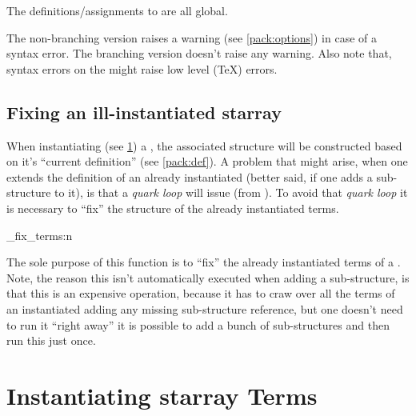 \documentclass[10pt]{article}
\begin{document}

The definitions/assignments  to  are all global.

\begin{tsremark}
The non-branching version raises a warning (see \ref{pack:options}) in case of a  syntax error. The branching version doesn't raise any warning. Also note that, syntax errors on the  might raise low level (\TeX) errors.
\end{tsremark}

\subsection{Fixing an ill-instantiated starray}\label{pack:def-fix}

When instantiating (see \ref{pack:instantiate}) a , the associated structure will be constructed based on it's ``current definition'' (see \ref{pack:def}). A problem that might arise, when one extends the definition of an already instantiated   (better said, if one adds a sub-structure to it), is that a \textsl{quark loop} will issue (from ). To avoid that  \textsl{quark loop} it is necessary to ``fix'' the structure of the already instantiated terms.

\begin{codedescribe}{\starray_fix_terms:n}
\begin{codesyntax}%
\end{codesyntax}
The sole purpose of this function is to ``fix'' the already instantiated terms of a . Note, the reason this isn't automatically executed when adding a sub-structure, is that this is an expensive operation, because it has to craw over all the terms of an instantiated  adding any missing sub-structure reference, but one doesn't need to run it ``right away'' it is possible to add a bunch of sub-structures and then run this just once.
\end{codedescribe}


\section{Instantiating starray Terms}\label{pack:instantiate}
\end{document}
